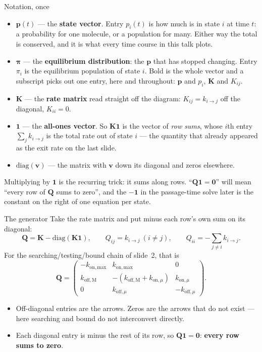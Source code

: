 \documentclass[10pt,aspectratio=169]{beamer}
\newcommand{\Q}{\bm{Q}}
\newcommand{\pib}{\bm{\pi}}
\begin{document}
\begin{frame}{Notation, once}
  \begin{itemize}
    \item $\bm{p}(t)$ --- the \textbf{state vector}. Entry $p_i(t)$ is how
      much is in state $i$ at time $t$: a probability for one molecule, or a
      population for many. Either way the total is conserved, and it is what
      every time course in this talk plots.
    \item $\pib$ --- the \textbf{equilibrium distribution}: the
      $\bm{p}$ that has stopped changing. Entry $\pi_i$ is the
      equilibrium population of state $i$. Bold is the whole vector and a
      subscript picks out one entry, here and throughout: $\bm{p}$ and
      $p_i$, $\bm{K}$ and $K_{ij}$.
    \item $\bm{K}$ --- the \textbf{rate matrix} read straight off the
      diagram: $K_{ij}=k_{i\to j}$ off the diagonal, $K_{ii}=0$.
    \item $\bm{1}$ --- the \textbf{all-ones vector}. So $\bm{K}\bm{1}$ is the
      vector of \emph{row sums}, whose $i$th entry
      $\sum_j k_{i\to j}$ is the total rate out of state $i$ --- the
      quantity that already appeared as the exit rate on the last slide.
    \item $\mathrm{diag}(\bm{v})$ --- the matrix with $\bm{v}$ down its
      diagonal and zeros elsewhere.
  \end{itemize}
  \vspace{0.4em}
  Multiplying by $\bm{1}$ is the recurring trick: it sums along rows.
  ``$\bm{Q}\bm{1}=\bm{0}$'' will mean ``every row of $\bm{Q}$ sums to
  zero'', and the $-\bm{1}$ in the passage-time solve later is the constant
  on the right of one equation per state.
\end{frame}

\begin{frame}{The generator}
  Take the rate matrix and put minus each row's own sum on its diagonal:
  \[
    \Q = \bm{K} - \mathrm{diag}(\bm{K}\bm{1}),
    \qquad
    Q_{ij} = k_{i\to j}\ (i\neq j),
    \qquad
    Q_{ii} = -\sum_{j\neq i} k_{i\to j}.
  \]
  For the searching/testing/bound chain of slide~2, that is
  \[
    \Q =
    \begin{pmatrix}
      -k_{\mathrm{on,max}} & k_{\mathrm{on,max}} & 0\\[2pt]
      k_{\mathrm{off,M}} & -(k_{\mathrm{off,M}}+k_{\mathrm{on},\mu})
        & k_{\mathrm{on},\mu}\\[2pt]
      0 & k_{\mathrm{off},\mu} & -k_{\mathrm{off},\mu}
    \end{pmatrix} .
  \]
  \begin{itemize}
    \item Off-diagonal entries are the arrows. Zeros are the arrows that do
      not exist --- here searching and bound do not interconvert directly.
    \item Each diagonal entry is minus the rest of its row, so
      $\Q\bm{1}=\bm{0}$: \textbf{every row sums to zero}.
  \end{itemize}
\end{frame}
\end{document}
